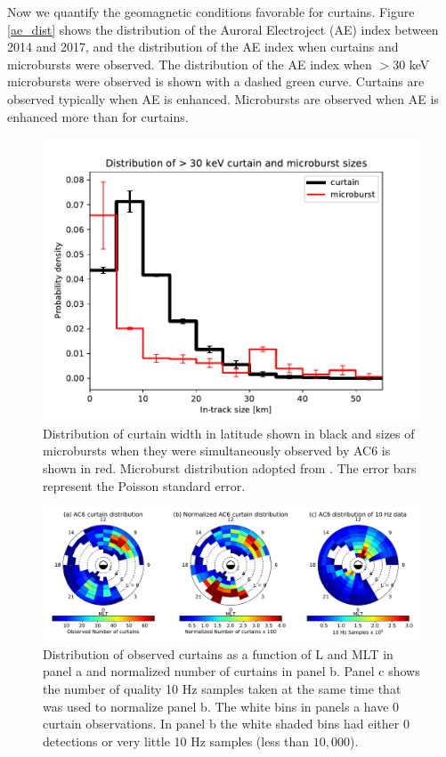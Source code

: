 \documentclass[draft]{agujournal2019}
\begin{document}
Now we quantify the geomagnetic conditions favorable for curtains. Figure \ref{ae_dist} shows the distribution of the Auroral Electroject (AE) index between 2014 and 2017, and the distribution of the AE index when curtains and microbursts were observed. The distribution of the AE index when $> 30$ keV microbursts were observed is shown with a dashed green curve. Curtains are observed typically when AE is enhanced. Microbursts are observed when AE is enhanced more than for curtains.

\begin{figure}
\includegraphics[width=\textwidth]{ac6_curtain_microburst_width_dist.pdf}
\caption{Distribution of curtain width in latitude shown in black and sizes of microbursts when they were simultaneously observed by AC6 is shown in red. Microburst distribution adopted from . The error bars represent the Poisson standard error.}
\label{width_dist}
\end{figure}

\begin{figure}
\includegraphics[width=\textwidth]{fig2_2.pdf}
\caption{Distribution of observed curtains as a function of L and MLT in panel a and normalized number of curtains in panel b. Panel c shows the number of quality 10 Hz samples taken at the same time that was used to normalize panel b. The white bins in panels a have 0 curtain observations. In panel b the white shaded bins had either 0 detections or very little 10 Hz samples (less than $10,000$).}
\label{l_mlt_dist}
\end{figure}
\end{document}
